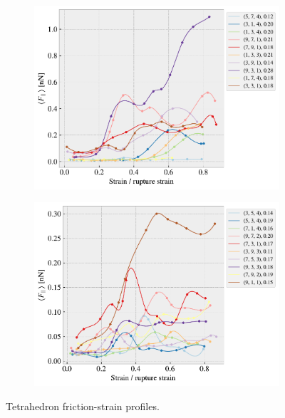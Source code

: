 \begin{figure}[H]
\begin{subfigure}[b]{0.49\textwidth}
        \includegraphics[width=\textwidth]{figures/stretch_profiles/popup/SP_4_popup.pdf}
        \caption{}
    \end{subfigure}
    \hfill
    \begin{subfigure}[b]{0.49\textwidth}
        \centering
        \includegraphics[width=\textwidth]{figures/stretch_profiles/popup/SP_5_popup.pdf}
        \caption{}
    \end{subfigure}
    \hfill
    \caption{Tetrahedron friction-strain profiles.}
    \label{fig:fric_strain_pop}
\end{figure}



